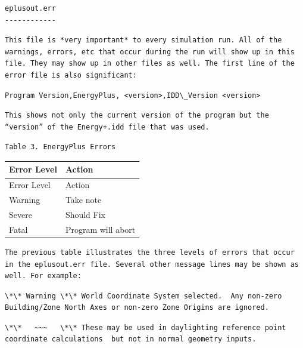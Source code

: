\begin{lstlisting}
eplusout.err
------------
\end{lstlisting}

\begin{lstlisting}
This file is *very important* to every simulation run. All of the warnings, errors, etc that occur during the run will show up in this file. They may show up in other files as well. The first line of the error file is also significant:
\end{lstlisting}

\begin{lstlisting}
Program Version,EnergyPlus, <version>,IDD\_Version <version>
\end{lstlisting}

\begin{lstlisting}
This shows not only the current version of the program but the “version” of the Energy+.idd file that was used.
\end{lstlisting}

\begin{lstlisting}
Table 3. EnergyPlus Errors
\end{lstlisting}

\begin{longtable}[c]{@{}ll@{}}
\toprule 
Error Level & Action \tabularnewline
\midrule
\endfirsthead

\toprule 
Error Level & Action \tabularnewline
\midrule
\endhead

Warning & Take note \tabularnewline
Severe & Should Fix \tabularnewline
Fatal & Program will abort \tabularnewline
\bottomrule
\end{longtable}

\begin{lstlisting}
The previous table illustrates the three levels of errors that occur in the eplusout.err file. Several other message lines may be shown as well. For example:
\end{lstlisting}

\begin{lstlisting}
\*\* Warning \*\* World Coordinate System selected.  Any non-zero Building/Zone North Axes or non-zero Zone Origins are ignored.
\end{lstlisting}

\begin{lstlisting}
\*\*   ~~~   \*\* These may be used in daylighting reference point coordinate calculations  but not in normal geometry inputs.
\end{lstlisting}

